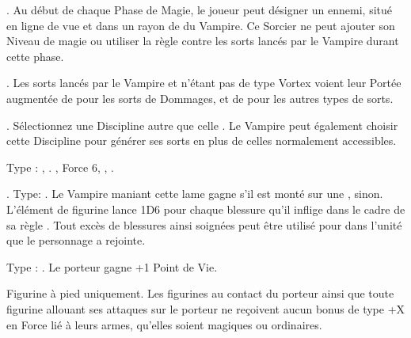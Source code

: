 \startpricelist

 \textbf{\ancientbloodpower}. Au début de chaque Phase de Magie, le joueur peut désigner un \wizard{} ennemi, situé en ligne de vue et dans un rayon de  du Vampire. Ce Sorcier ne peut ajouter son Niveau de magie ou utiliser la règle \removedrule{\aideddispel{}} contre les sorts lancés par le Vampire durant cette phase. 

 \textbf{\bloodlinepower}. Les sorts lancés par le Vampire et n'étant pas de type Vortex voient leur Portée augmentée de  pour les sorts de Dommages, et de  pour les autres types de sorts.

 \textbf{\bloodlinepower}. Sélectionnez une Discipline \battle{} autre que celle \nature{}. Le Vampire peut également choisir cette Discipline pour générer ses sorts en plus de celles normalement accessibles.

\endpricelist


\closearmynewsection

\startarmymagicalitems

\armymagicalweapons

\startpricelist

 Type : \artilleryweapon{}, \boltthrower{}. , Force 6, , .

 . Type: \hw{}. Le Vampire maniant cette lame gagne  s'il est monté sur une \largetarget{},  sinon. L'élément de figurine lance 1D6 pour chaque blessure qu'il inflige dans le cadre de sa règle \vampiric{}. Tout excès de blessures ainsi soignées peut être utilisé pour \raisewounds{} dans l'unité que le personnage a rejointe.

\endpricelist

\armymagicalarmour

\startpricelist

 Type : \platearmour{}. Le porteur gagne +1 Point de Vie.

\endpricelist

\armytalismans

\startpricelist

 Figurine à pied uniquement. Les figurines au contact du porteur ainsi que toute figurine allouant ses attaques sur le porteur ne reçoivent aucun bonus de type +X en Force lié à leurs armes, qu'elles soient magiques ou ordinaires.


